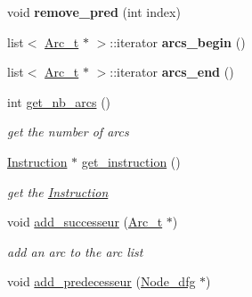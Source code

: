 \begin{DoxyCompactItemize}
\item 
\hypertarget{class_node__dfg_a0f65316cde0b35e7755d4ebf009b009b}{void {\bfseries remove\+\_\+pred} (int index)}\label{class_node__dfg_a0f65316cde0b35e7755d4ebf009b009b}

\item 
\hypertarget{class_node__dfg_a6ebd568efb70f729f6e355cdd46a5185}{list$<$ \hyperlink{struct_arc__t}{Arc\+\_\+t} $\ast$ $>$\+::iterator {\bfseries arcs\+\_\+begin} ()}\label{class_node__dfg_a6ebd568efb70f729f6e355cdd46a5185}

\item 
\hypertarget{class_node__dfg_a5a49217bcb16aaf7e94e4e156d9a9d53}{list$<$ \hyperlink{struct_arc__t}{Arc\+\_\+t} $\ast$ $>$\+::iterator {\bfseries arcs\+\_\+end} ()}\label{class_node__dfg_a5a49217bcb16aaf7e94e4e156d9a9d53}

\item 
\hypertarget{class_node__dfg_a85d42a5cc1d6feacf403a8569a813074}{int \hyperlink{class_node__dfg_a85d42a5cc1d6feacf403a8569a813074}{get\+\_\+nb\+\_\+arcs} ()}\label{class_node__dfg_a85d42a5cc1d6feacf403a8569a813074}

\begin{DoxyCompactList}\small\item\em get the number of arcs \end{DoxyCompactList}\item 
\hypertarget{class_node__dfg_a8f20c21a0ffb2e224cc426148362c249}{\hyperlink{class_instruction}{Instruction} $\ast$ \hyperlink{class_node__dfg_a8f20c21a0ffb2e224cc426148362c249}{get\+\_\+instruction} ()}\label{class_node__dfg_a8f20c21a0ffb2e224cc426148362c249}

\begin{DoxyCompactList}\small\item\em get the \hyperlink{class_instruction}{Instruction} \end{DoxyCompactList}\item 
\hypertarget{class_node__dfg_add9d669804bc8ad4a4b806221d9ef9e9}{void \hyperlink{class_node__dfg_add9d669804bc8ad4a4b806221d9ef9e9}{add\+\_\+successeur} (\hyperlink{struct_arc__t}{Arc\+\_\+t} $\ast$)}\label{class_node__dfg_add9d669804bc8ad4a4b806221d9ef9e9}

\begin{DoxyCompactList}\small\item\em add an arc to the arc list \end{DoxyCompactList}\item 
\hypertarget{class_node__dfg_a8cc89b32dbe15bcf399725955a643551}{void \hyperlink{class_node__dfg_a8cc89b32dbe15bcf399725955a643551}{add\+\_\+predecesseur} (\hyperlink{class_node__dfg}{Node\+\_\+dfg} $\ast$)}\label{class_node__dfg_a8cc89b32dbe15bcf399725955a643551}


\end{DoxyCompactItemize}
